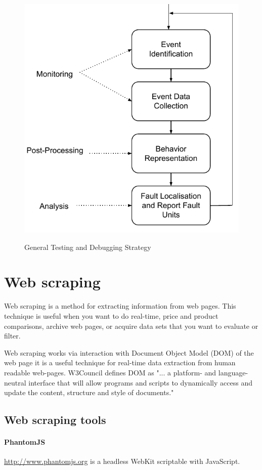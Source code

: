 \begin{figure}[ht]
	\centering
	\includegraphics[width=0.7\linewidth]{grafiken/GeneralTestingAndDebugging}
	\label{fig:GeneralTestingAndDebugging}
	\caption{General Testing and Debugging Strategy\cite{rtSandD}}
\end{figure}

\section{Web scraping}
\label{sec:scraping}
Web scraping is a method for extracting information from web pages\cite{wikiScraping}. This technique is useful when you want to do real-time, price and product comparisons, archive web pages, or acquire data sets that you want to evaluate or filter\cite{conScrap}.

Web scraping works via interaction with Document Object Model (DOM) of the web page it is a useful technique for real-time data extraction from human readable web-pages. W3Council defines DOM\cite{w3cDOM} as "... a platform- and language-neutral interface that will allow programs and scripts to dynamically access and update the content, structure and style of documents." 

\subsection{Web scraping tools}

\paragraph{PhantomJS}\cite{phantom} \url{http://www.phantomjs.org} is a headless WebKit scriptable with JavaScript. 

